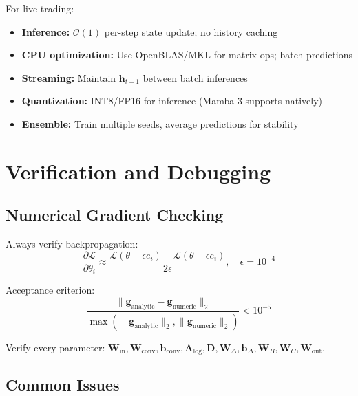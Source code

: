 \documentclass[11pt,a4paper]{article}
\newcommand{\loss}{\mathcal{L}}
\begin{document}
For live trading:
\begin{itemize}
  \item \textbf{Inference:} $\mathcal{O}(1)$ per-step state update; no history caching
  \item \textbf{CPU optimization:} Use OpenBLAS/MKL for matrix ops; batch predictions
  \item \textbf{Streaming:} Maintain $\mathbf{h}_{t-1}$ between batch inferences
  \item \textbf{Quantization:} INT8/FP16 for inference (Mamba-3 supports natively)
  \item \textbf{Ensemble:} Train multiple seeds, average predictions for stability
\end{itemize}

\section{Verification and Debugging}

\subsection{Numerical Gradient Checking}

Always verify backpropagation:
\[
\frac{\partial \loss}{\partial \theta_i} \approx \frac{\loss(\theta + \epsilon e_i) - \loss(\theta - \epsilon e_i)}{2\epsilon}, \quad \epsilon = 10^{-4}
\]

Acceptance criterion:
\[
\frac{\| \mathbf{g}_{\text{analytic}} - \mathbf{g}_{\text{numeric}} \|_2}{\max(\| \mathbf{g}_{\text{analytic}} \|_2, \| \mathbf{g}_{\text{numeric}} \|_2)} < 10^{-5}
\]

Verify every parameter: $\mathbf{W}_{\text{in}}, \mathbf{W}_{\text{conv}},
\mathbf{b}_{\text{conv}}, \mathbf{A}_{\log}, \mathbf{D}, \mathbf{W}_\Delta,
\mathbf{b}_\Delta, \mathbf{W}_B, \mathbf{W}_C, \mathbf{W}_{\text{out}}$.

\subsection{Common Issues}
\end{document}
